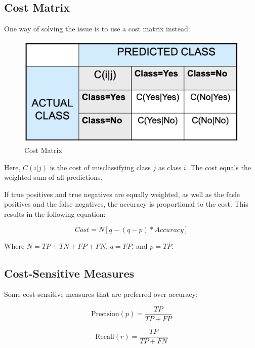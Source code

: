 \subsection{Cost Matrix}

One way of solving the issue is to use a cost matrix instead:

\bigskip
\begin{figure}[H]
    \centering
    \includegraphics[scale=0.5]{figures/costmatrix.png}
    \caption{Cost Matrix}
\end{figure}

Here, $C(i|j)$ is the cost of misclassifying class $j$ as class $i$. The cost equals the weighted sum of all predictions.

\bigskip

If true positives and true negatives are equally weighted, as well as the fasle positives and the false negatives, the accuracy is proportional to the cost.
This results in the following equation:

\begin{equation}
    Cost = N[q-(q-p)*Accuracy]
\end{equation}
\begin{center}
    Where $N = TP + TN + FP + FN$, $q = FP$, and $p = TP$.
\end{center}


\subsection{Cost-Sensitive Measures}
Some cost-sensitive measures that are preferred over accuracy:

\begin{equation}
    \text{Precision}(p) = \frac{TP}{TP+FP}
\end{equation}

\begin{equation}
    \text{Recall}(r) = \frac{TP}{TP+FN}
\end{equation}

